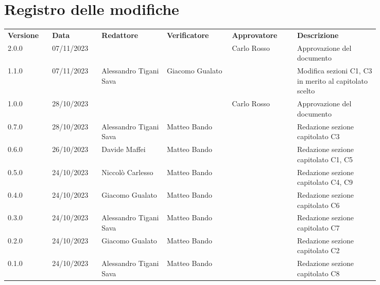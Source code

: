 \section*{Registro delle modifiche}
{
\renewcommand{\arraystretch}{1.5}
\scriptsize
\begin{tabular}{p{0.10\linewidth}p{0.10\linewidth}p{0.15\linewidth}p{0.15\linewidth}p{0.15\linewidth}p{0.19\linewidth}}
    \textbf{Versione}   & \textbf{Data} & \textbf{Redattore}     & \textbf{Verificatore} & \textbf{Approvatore}  & \textbf{Descrizione}  \\
    2.0.0   & 07/11/2023    &						 &	                & Carlo Rosso & Approvazione del documento   \\
    \hline
    1.1.0   & 07/11/2023    & Alessandro Tigani Sava & Giacomo Gualato  &   & Modifica sezioni C1, C3 in merito al capitolato scelto \\
    \hline
    1.0.0   & 28/10/2023    &						 &	                & Carlo Rosso & Approvazione del documento   \\
    \hline
    0.7.0   & 28/10/2023    & Alessandro Tigani Sava & Matteo Bando	    &   & Redazione sezione capitolato C3   \\
    \hline
    0.6.0   & 26/10/2023    & Davide Maffei          & Matteo Bando     &   & Redazione sezione capitolato C1, C5   \\   
    \hline 
    0.5.0   & 24/10/2023    & Niccolò Carlesso       & Matteo Bando     &   & Redazione sezione capitolato C4, C9  	\\
    \hline
    0.4.0   & 24/10/2023    & Giacomo Gualato        & Matteo Bando     &   & Redazione sezione capitolato C6  	\\
    \hline
    0.3.0   & 24/10/2023    & Alessandro Tigani Sava & Matteo Bando     &   & Redazione sezione capitolato C7   \\
    \hline
    0.2.0   & 24/10/2023    & Giacomo Gualato        & Matteo Bando     &   & Redazione sezione capitolato C2   \\
    \hline
    0.1.0   & 24/10/2023    & Alessandro Tigani Sava & Matteo Bando	    &   & Redazione sezione capitolato C8   \\    
    \hline
\end{tabular}
}
